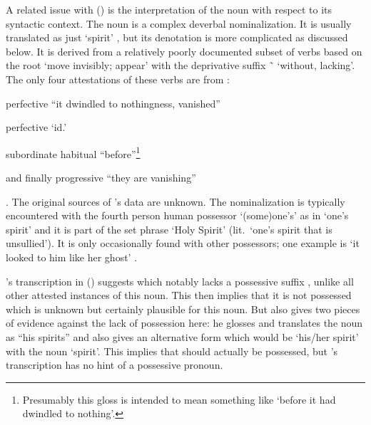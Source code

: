 A related issue with (\lastx) is the interpretation of the noun  with respect to its syntactic context.
The noun  is a complex deverbal nominalization.
It is usually translated as just ‘spirit’ \parencites[e.g.][462]{swanton:1908}[\textsc{t}·96]{leer:2001}, but its denotation is more complicated as discussed below.
It is derived from a relatively poorly documented subset of verbs based on the root  ‘move invisibly; appear’ \parencite[1]{leer:1978b} with the deprivative suffix  \~\  ‘without, lacking’.
The only four attestations of these verbs are from \citeauthor{leer:1973}:
\begin{inlineenum}
\item	perfective  “it dwindled to nothingness, vanished”
\item	perfective  ‘id.’
\item	subordinate habitual  “before”\footnote{Presumably this gloss is intended to mean something like ‘before it had dwindled to nothing’.}
\item	and finally progressive  “they are vanishing”
\end{inlineenum}
\parencite[01/19]{leer:1973}.
The original sources of \citeauthor{leer:1973}’s data are unknown.
The nominalization is typically encountered with the fourth person human possessor  ‘(some)one’s’ as in  ‘one’s spirit’ and it is part of the set phrase  ‘Holy Spirit’ (lit.\ ‘one’s spirit that is unsullied’).
It is only occasionally found with other possessors; one example is  ‘it looked to him like her ghost’ \parencite[162.187]{dauenhauer:1987}.

\citeauthor{swanton:1909}’s transcription  in (\lastx) suggests  which notably lacks a possessive suffix , unlike all other attested instances of this noun.
This then implies that it is not possessed which is unknown but certainly plausible for this noun.
But \citeauthor{swanton:1909} also gives two pieces of evidence against the lack of possession here: he glosses and translates the noun as “his spirits” and also gives an alternative form  which would be  ‘his/her spirit’ with the noun  ‘spirit’.
This implies that  should actually be possessed, but \citeauthor{swanton:1909}’s transcription has no hint of a possessive pronoun.


